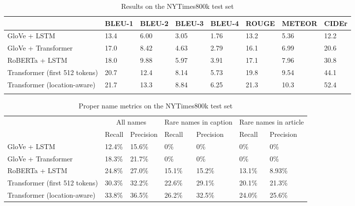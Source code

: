 \documentclass[10pt,twocolumn,letterpaper]{article}
\begin{document}
\begin{table*}[t]
	\caption {Results on the NYTimes800k test set}
	\label{tab:results-nytimes}
	\centering
	\begin{tabular}{llllllll}
		\toprule
		  & BLEU-1  & BLEU-2 & BLEU-3 & BLEU-4 & ROUGE & METEOR & CIDEr \\
      \midrule
      GloVe + LSTM & 13.4 & 6.00 & 3.05 & 1.76 & 13.2 & 5.36 & 12.2 \\ %
      GloVe + Transformer & 17.0 & 8.42 & 4.63 & 2.79 & 16.1 & 6.99 & 20.6 \\ %
      RoBERTa + LSTM & 18.0 & 9.88 & 5.97 & 3.91 & 17.1 & 7.96 & 30.8 \\ %
      Transformer (first 512 tokens) & 20.7 & 12.4 & 8.14 & 5.73 & 19.8 & 9.54 & 44.1 \\ %
      Transformer (location-aware) & 21.7 & 13.3 & 8.84 & 6.25 & 21.3 & 10.3 & 52.4 \\ %
      \\
		\bottomrule
	\end{tabular}
\end{table*}

\begin{table*}[t]
	\caption {Proper name metrics on the NYTimes800k test set}
	\label{tab:results-names}
	\centering
	\begin{tabular}{lllllll}
		\toprule
        & \multicolumn{2}{c}{All names} & \multicolumn{2}{c}{Rare names in caption } & \multicolumn{2}{c}{Rare names in article } \\
        & Recall  & Precision & Recall  & Precision & Recall  & Precision \\
      \midrule
      GloVe + LSTM & 12.4\% & 15.6\% & 0\% & 0\% & 0\% & 0\%  \\
      GloVe + Transformer & 18.3\% & 21.7\% & 0\% & 0\% & 0\% & 0\%  \\
      RoBERTa + LSTM & 24.8\% & 27.0\% & 15.1\% & 15.2\% & 13.1\% & 8.93\%  \\
      Transformer (first 512 tokens) & 30.3\% & 32.2\% & 22.6\% & 29.1\% & 20.1\% & 21.3\%  \\
      Transformer (location-aware) & 33.8\% & 36.5\% & 26.2\% & 32.5\% & 24.0\% & 25.6\%   \\
		\bottomrule
	\end{tabular}
\end{table*}
\end{document}
